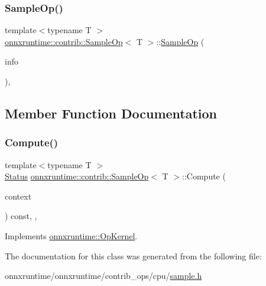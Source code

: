 \subsubsection{\texorpdfstring{Sample\+Op()}{SampleOp()}}
{\footnotesize\ttfamily template$<$typename T $>$ \\
\mbox{\hyperlink{classonnxruntime_1_1contrib_1_1SampleOp}{onnxruntime\+::contrib\+::\+Sample\+Op}}$<$ T $>$\+::\mbox{\hyperlink{classonnxruntime_1_1contrib_1_1SampleOp}{Sample\+Op}} (\begin{DoxyParamCaption}\item[{const \mbox{\hyperlink{classonnxruntime_1_1OpKernelInfo}{Op\+Kernel\+Info}} \&}]{info }\end{DoxyParamCaption})\hspace{0.3cm}{\ttfamily [inline]}, {\ttfamily [explicit]}}



\subsection{Member Function Documentation}
\mbox{\label{classonnxruntime_1_1contrib_1_1SampleOp_a492aa20d46920d99aced3e7c355d844d}} 
\subsubsection{\texorpdfstring{Compute()}{Compute()}}
{\footnotesize\ttfamily template$<$typename T $>$ \\
\mbox{\hyperlink{classonnxruntime_1_1common_1_1Status}{Status}} \mbox{\hyperlink{classonnxruntime_1_1contrib_1_1SampleOp}{onnxruntime\+::contrib\+::\+Sample\+Op}}$<$ T $>$\+::Compute (\begin{DoxyParamCaption}\item[{\mbox{\hyperlink{classonnxruntime_1_1OpKernelContext}{Op\+Kernel\+Context}} $\ast$}]{context }\end{DoxyParamCaption}) const\hspace{0.3cm}{\ttfamily [inline]}, {\ttfamily [override]}, {\ttfamily [virtual]}}



Implements \mbox{\hyperlink{classonnxruntime_1_1OpKernel_a9eca8656a78b1b3ab9d3351a12798650}{onnxruntime\+::\+Op\+Kernel}}.



The documentation for this class was generated from the following file\+:\begin{DoxyCompactItemize}
\item 
onnxruntime/onnxruntime/contrib\+\_\+ops/cpu/\mbox{\hyperlink{sample_8h}{sample.\+h}}\end{DoxyCompactItemize}
